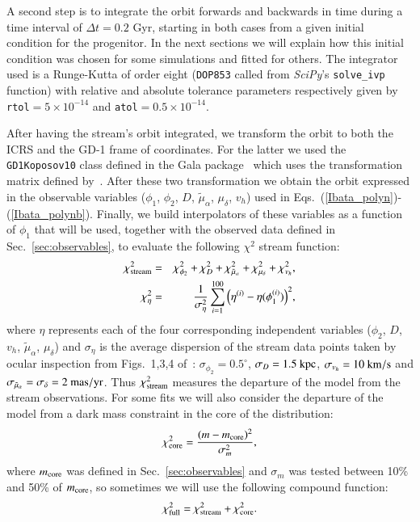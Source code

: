 \documentclass[twocolumn]{aa}
\begin{document}
A second step is to integrate the orbit forwards and backwards in time during a time interval of $\Delta t=0.2$ Gyr, starting in both cases from a given initial condition for the progenitor. In the next sections
we will explain how this initial condition was chosen for some simulations and fitted for others. The integrator used is a Runge-Kutta of order eight (\texttt{DOP853} called from {\it SciPy}'s \texttt{solve\_ivp} function) with relative and absolute tolerance parameters respectively given by
\texttt{rtol}$=5\times10^{-14}$ and \texttt{atol}$=0.5\times10^{-14}$.

After having the stream's orbit integrated, we transform the orbit to both the ICRS and the GD-1 frame of coordinates. For the latter we used the \texttt{GD1Koposov10} class defined in the Gala package~\citep{gala,adrian_price_whelan_2020_4159870} which uses the transformation matrix defined
by~\citet{Koposov_2010}.
After these two transformation we obtain the orbit expressed in the observable variables ($\phi_1$, $\phi_2$, $D$, $\tilde{\mu}_\alpha$, $\mu_\delta$, $v_h$) used in Eqs.~(\ref{Ibata_polyn})-(\ref{Ibata_polynb}).
Finally, we build interpolators of these variables as a function of $\phi_1$ that will be used, together with the observed data defined in Sec.~\ref{sec:observables}, to evaluate the following $\chi^2$ stream function:
\begin{eqnarray}
   \label{chi2}
   \chi^2_{\rm{stream}} &=& \chi^2_{\phi_2} + \chi^2_{D}+ \chi^2_{\tilde{\mu}_\alpha}+ \chi^2_{\mu_\delta}+\chi^2_{v_h},\\
   \chi^2_{\eta} &=& \frac{1}{\sigma_\eta^2}\sum_{i=1}^{100} \Big(\eta^{(i)}-\eta(\phi_1^{(i)})\Big)^2,
\end{eqnarray}
where
$\eta$ represents each of the four corresponding independent variables ($\phi_2$, $D$, $v_h$, $\tilde{\mu}_\alpha$, $\mu_\delta$) and $\sigma_\eta$ is the average dispersion of the stream data points taken by
ocular inspection from Figs.~1,3,4 of~\citet{Ibata_2020}:
$\sigma_{\phi_2}=0.5^\circ$,
$\sigma_{D}= 1.5~\rm{kpc}$,
$\sigma_{v_h} = 10~\rm{km/s}$ and
$\sigma_{\tilde{\mu}_\alpha}= \sigma_{\delta}= 2~\rm{mas/yr}$.
Thus $\chi^2_{\rm{stream}}$ measures the departure of the model from the stream observations.
For some fits we will also consider the departure of the model from a dark mass constraint in the core
of the distribution:
\begin{equation}
   \label{m_core}
   \chi^2_{\rm{core}}=\frac{(m-m_{\rm{core}})^2}{\sigma_m^2},
\end{equation}
where $m_{\rm{core}}$ was defined in Sec.~\ref{sec:observables} and
$\sigma_m$ was tested between 10\% and 50\% of $m_{\rm{core}}$, so sometimes we will use the following compound function:
\begin{equation}
   \label{chi2_full}
   \chi^2_{\rm{full}}=\chi^2_{\rm{stream}}+\chi^2_{\rm{core}}.
\end{equation}
\end{document}
